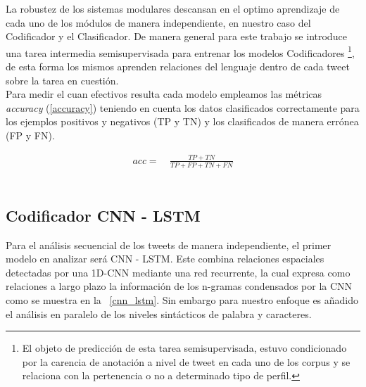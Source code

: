 	 La robustez de los sistemas modulares descansan en el optimo aprendizaje de cada uno de los módulos de manera independiente, en nuestro caso del Codificador y el Clasificador. De manera general para este trabajo se introduce una tarea intermedia semisupervisada para entrenar los modelos Codificadores \footnote{El objeto de predicción de esta tarea semisupervisada, estuvo condicionado por la carencia de anotación a nivel de tweet en cada uno de los corpus y se relaciona con la pertenencia o no a determinado tipo de perfil.}, de esta forma los mismos aprenden relaciones del lenguaje dentro de cada tweet sobre la tarea en cuestión.\\
	 Para medir el cuan efectivos resulta cada modelo empleamos las métricas \textit{accuracy} (\ref{accuracy}) teniendo en cuenta los datos clasificados correctamente para los ejemplos positivos y negativos (TP y TN) y los clasificados de manera errónea (FP y FN).
	 
	 \begin{align}
	 	acc=~& \frac{TP + TN}{TP + FP + TN + FN}\label{accuracy}
	 \end{align}\\%
 
 	\subsection{Codificador CNN - LSTM}
 	
 	Para el análisis secuencial de los tweets de manera independiente, el primer modelo en analizar será CNN - LSTM. Este combina relaciones espaciales detectadas por una 1D-CNN mediante una red recurrente, la cual expresa como relaciones a largo plazo la información de los n-gramas condensados por la CNN como se muestra en la \figurename~\ref{cnn_lstm}.   Sin embargo para nuestro enfoque es añadido el análisis en paralelo de los niveles sintácticos de palabra y caracteres.  	\\
 	
